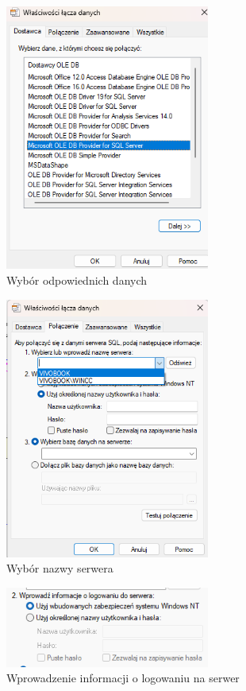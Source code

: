 \documentclass{report}
\begin{document}
\begin{figure}[H]
    \centering
    \includegraphics[width=0.6\textwidth]{src/Database/Stage2.png}
    \caption{Wybór odpowiednich danych}
    \label{fig:first-att}
\end{figure}

\begin{figure}[H]
    \centering
    \includegraphics[width=0.6\textwidth]{src/Database/Stage3.png}
    \caption{Wybór nazwy serwera}
    \label{fig:first-att}
\end{figure}

\begin{figure}[H]
    \centering
    \includegraphics[width=0.6\textwidth]{src/Database/Stage4.png}
    \caption{Wprowadzenie informacji o logowaniu na serwer}
    \label{fig:first-att}
\end{figure}
\end{document}
